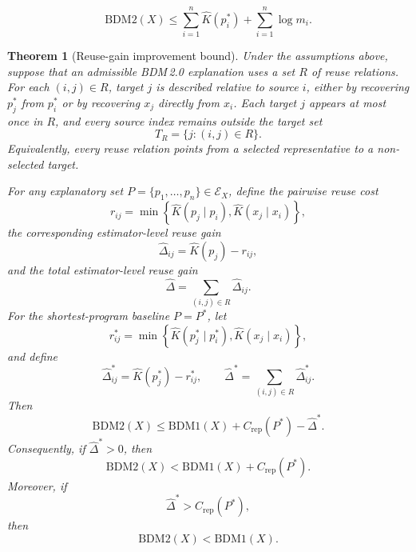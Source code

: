 \documentclass[10pt,a4paper]{amsart}
\newtheorem{theorem}{Theorem}
\begin{document}
\begin{equation}
\label{eq:bdm2-independent-bound}
\mathrm{BDM2}(X)
\leq
\sum_{i=1}^{n}\hat K(p_i^*)
+
\sum_{i=1}^{n}\log m_i.
\end{equation}

\begin{theorem}[Reuse-gain improvement bound]
\label{thm:bdm2-reuse-improvement}
Under the assumptions above, suppose that an admissible BDM\,2.0 explanation uses a set \(R\) of reuse relations. For each \((i,j)\in R\), target \(j\) is described relative to source \(i\), either by recovering \(p_j^*\) from \(p_i^*\) or by recovering \(x_j\) directly from \(x_i\). Each target \(j\) appears at most once in \(R\), and every source index remains outside the target set
\[
T_R
=
\{j:(i,j)\in R\}.
\]
Equivalently, every reuse relation points from a selected representative to a non-selected target.

For any explanatory set \(P=\{p_1,\ldots,p_n\}\in\mathcal E_X\), define the pairwise reuse cost
\[
r_{ij}
=
\min
\left\{
\hat K(p_j\mid p_i),
\hat K(x_j\mid x_i)
\right\},
\]
the corresponding estimator-level reuse gain
\[
\hat{\Delta}_{ij}
=
\hat K(p_j)-r_{ij},
\]
and the total estimator-level reuse gain
\[
\hat{\Delta}
=
\sum_{(i,j)\in R}
\hat{\Delta}_{ij}.
\]
For the shortest-program baseline \(P=P^*\), let
\[
r_{ij}^*
=
\min
\left\{
\hat K(p_j^*\mid p_i^*),
\hat K(x_j\mid x_i)
\right\},
\]
and define
\[
\hat{\Delta}_{ij}^*
=
\hat K(p_j^*)-r_{ij}^*,
\qquad
\hat{\Delta}^*
=
\sum_{(i,j)\in R}
\hat{\Delta}_{ij}^*.
\]
Then
\[
\mathrm{BDM2}(X)
\leq
\mathrm{BDM1}(X)
+
C_{\mathrm{rep}}(P^*)
-
\hat{\Delta}^*.
\]
Consequently, if \(\hat{\Delta}^*>0\), then
\[
\mathrm{BDM2}(X)
<
\mathrm{BDM1}(X)
+
C_{\mathrm{rep}}(P^*).
\]
Moreover, if
\[
\hat{\Delta}^*
>
C_{\mathrm{rep}}(P^*),
\]
then
\[
\mathrm{BDM2}(X)
<
\mathrm{BDM1}(X).
\]
\end{theorem}
\end{document}
